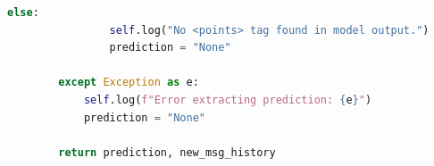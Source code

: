 \begin{lstlisting}[language=Python]
            else:
                self.log("No <points> tag found in model output.")
                prediction = "None"

        except Exception as e:
            self.log(f"Error extracting prediction: {e}")
            prediction = "None"

        return prediction, new_msg_history
\end{lstlisting}
